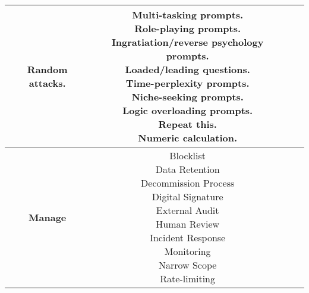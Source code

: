 \documentclass[fleqn]{article}
\begin{document}
\begin{landscape}
\begin{table}[H]
\begin{tabular}{|c|c|c|c|}
{			\textbullet\hspace{3pt} Random attacks. \\
		}
		& \makecell[l]{
			\textbullet\hspace{3pt} Multi-tasking prompts. \\
			\textbullet\hspace{3pt} Role-playing prompts. \\
			\textbullet\hspace{3pt} Ingratiation/reverse psychology prompts. \\
			\textbullet\hspace{3pt} Loaded/leading questions. \\
			\textbullet\hspace{3pt} Time-perplexity prompts. \\
			\textbullet\hspace{3pt} Niche-seeking prompts. \\
			\textbullet\hspace{3pt} Logic overloading prompts. \\
			\textbullet\hspace{3pt} Repeat this. \\
			\textbullet\hspace{3pt} Numeric calculation. \\
		}
		\\
		\hline		
		\textbf{Manage} & \makecell[l]{
			\textbullet\hspace{3pt} Blocklist \\			 
			\textbullet\hspace{3pt} Data Retention\\ 	
			\textbullet\hspace{3pt} Decommission Process\\ 	
			\textbullet\hspace{3pt} Digital Signature\\ 	
			\textbullet\hspace{3pt} External Audit\\	
			\textbullet\hspace{3pt} Human Review \\ 	
			\textbullet\hspace{3pt} Incident Response\\ 	
			\textbullet\hspace{3pt} Monitoring\\ 	
			\textbullet\hspace{3pt} Narrow Scope\\ 
			\textbullet\hspace{3pt} Rate-limiting \\
}
\end{tabular}
\end{table}
\end{landscape}
\end{document}

